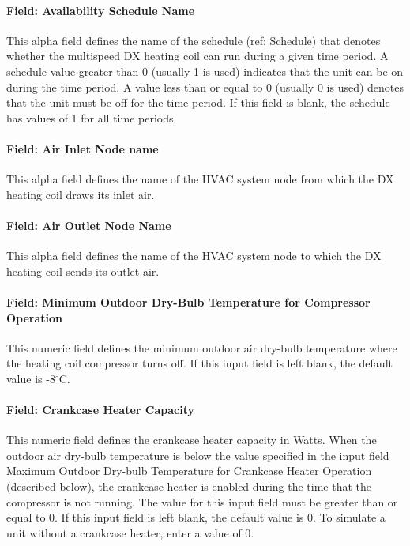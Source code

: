 \paragraph{Field: Availability Schedule Name}\label{field-availability-schedule-name-11-000}

This alpha field defines the name of the schedule (ref: Schedule) that denotes whether the multispeed DX heating coil can run during a given time period. A schedule value greater than 0 (usually 1 is used) indicates that the unit can be on during the time period. A value less than or equal to 0 (usually 0 is used) denotes that the unit must be off for the time period. If this field is blank, the schedule has values of 1 for all time periods.

\paragraph{Field: Air Inlet Node name}\label{field-air-inlet-node-name-14}

This alpha field defines the name of the HVAC system node from which the DX heating coil draws its inlet air.

\paragraph{Field: Air Outlet Node Name}\label{field-air-outlet-node-name-14}

This alpha field defines the name of the HVAC system node to which the DX heating coil sends its outlet air.

\paragraph{Field: Minimum Outdoor Dry-Bulb Temperature for Compressor Operation}\label{field-minimum-outdoor-dry-bulb-temperature-for-compressor-operation-1}

This numeric field defines the minimum outdoor air dry-bulb temperature where the heating coil compressor turns off. If this input field is left blank, the default value is -8$^\circ$C.

\paragraph{Field: Crankcase Heater Capacity}\label{field-crankcase-heater-capacity-5}

This numeric field defines the crankcase heater capacity in Watts. When the outdoor air dry-bulb temperature is below the value specified in the input field Maximum Outdoor Dry-bulb Temperature for Crankcase Heater Operation (described below), the crankcase heater is enabled during the time that the compressor is not running. The value for this input field must be greater than or equal to 0. If this input field is left blank, the default value is 0. To simulate a unit without a crankcase heater, enter a value of 0.

